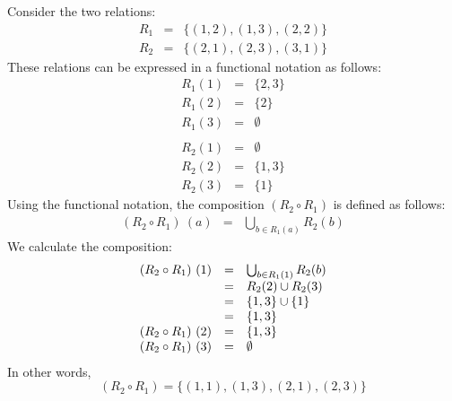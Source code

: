 \documentclass{llncs}
\begin{document}
\begin{example}
Consider the two relations:
\[\begin{array}{rcl}                                                                       
R_1 &=& \{ (1,2),(1,3),(2,2) \} \\                                                       
R_2 &=& \{ (2,1),(2,3),(3,1) \}                                                          
\end{array}\]
These relations can be expressed in a functional notation as follows:
\[\begin{array}{rcl}                                                                       
R_1 (1) &=& \{ 2,3 \} \\                                                                 
R_1 (2) &=& \{ 2 \} \\                                                                   
R_1 (3) &=& \emptyset \\
\\ 
R_2 (1) &=& \emptyset \\                                                                 
R_2 (2) &=& \{ 1,3 \} \\                                                                 
R_2 (3) &=& \{ 1 \}                                                                      
\end{array}\]
Using the functional notation, the composition $(R_2 \circ R_1)$ is defined as
follows:
\[\begin{array}{rcl}                                                                   
(R_2 \circ R_1)~(a) &=& \bigcup_{b \in R_1(a)} R_2(b)                                  
\end{array}\]
We calculate the composition:
\[\begin{array}[t]{rcl}                                                                  
(R_2 \circ R_1)~(1) &=& \bigcup_{b \in R_1(1)} R_2(b) \\                               
         &=& R_2(2) \cup R_2(3) \\                                                     
         &=& \{1,3\} \cup \{ 1 \} \\                                                   
         &=& \{ 1,3 \} \\                                                              
(R_2 \circ R_1)~(2) &=& \{ 1,3 \} \\                                                   
(R_2 \circ R_1)~(3) &=& \emptyset                                                      
\end{array}\]
In other words, 
\[
(R_2 \circ R_1) = \{(1,1), (1,3), (2,1), (2,3)\}
\]
\end{example}
\end{document}
